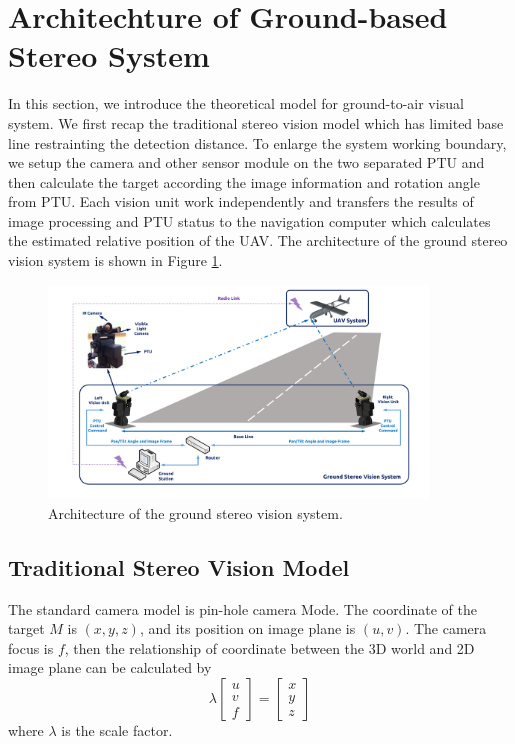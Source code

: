 \documentclass[journal,article,submit,moreauthors,pdftex,10pt,a4paper]{mdpi}
\begin{document}
\section{Architechture of Ground-based Stereo System}
In this section, we introduce the theoretical model for ground-to-air visual system. We first recap the traditional stereo vision model which has limited base line restrainting the detection distance. To enlarge the system working boundary, we setup the camera and other sensor module on the two separated PTU and then calculate the target according the image information and rotation angle from PTU. Each vision unit work independently and transfers the results of image processing and PTU status to the navigation computer which calculates the estimated relative position of the UAV. The architecture of the ground stereo vision system is shown in Figure \ref{fig:SystemStructure}.

\begin{figure}[!tb]
	\centering
	\includegraphics[width=0.9\textwidth]{Figs/SystemStructure2.pdf}
	\caption{Architecture of the ground stereo vision system.}
	\label{fig:SystemStructure}
\end{figure}


\subsection{Traditional Stereo Vision Model}
The standard camera model is pin-hole camera Mode. The coordinate of the target $M$ is $(x,y,z)$, and its position on image plane is $(u,v)$. The camera focus is $f$, then the relationship of coordinate between the 3D world and 2D image plane can be calculated by 
\begin{equation}
	\lambda\left[ {\begin{array}{*{20}{c}}
			u \\ 
			v \\ 
			f 
	\end{array}} \right] =\left[ {\begin{array}{*{20}{c}}
			x \\ 
			y \\ 
			z 
	\end{array}} \right]
\end{equation}
where $\lambda$ is the scale factor. 
\end{document}
